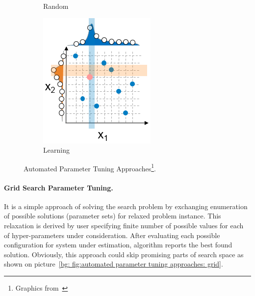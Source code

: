 \begin{figure}
\begin{subfigure}[b]{0.25\linewidth}
		\caption{Random}
		\label{bg: fig:automated parameter tuning approaches: random}
	\end{subfigure}
	\begin{subfigure}[b]{0.25\linewidth}
		\includegraphics[width=\linewidth]{graphics/Background/hyperparameter-learning-search.png}
		\caption{Learning}
		\label{bg: fig:automated parameter tuning approaches: learning}
	\end{subfigure}
	\caption{Automated Parameter Tuning Approaches\protect\footnote{Graphics from~\cite{koch2017automated}}.}
	\label{bg: fig:automated parameter tuning approaches}
\end{figure}


\paragraph{Grid Search Parameter Tuning.} It is a simple approach of solving the search problem by exchanging enumeration of possible solutions (parameter sets) for relaxed problem instance. This relaxation is derived by user specifying finite number of possible values for each of hyper-parameters under consideration. After evaluating each possible configuration for system under estimation, algorithm reports the best found solution. Obviously, this approach could skip promising parts of search space as shown on picture~\ref{bg: fig:automated parameter tuning approaches: grid}.


